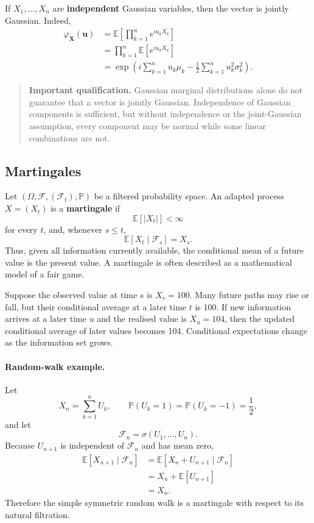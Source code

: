 \documentclass[12pt,openany]{book}
\theoremstyle{definition}
\theoremstyle{remark}
\begin{document}
If \(X_1,\ldots,X_n\) are \textbf{independent} Gaussian variables, then the
vector is jointly Gaussian. Indeed,
\[
\begin{aligned}
\varphi_{\boldsymbol{X}}(\boldsymbol{u})
&=\mathbb{E}\!\left[
\prod_{k=1}^{n}e^{iu_kX_k}
\right]\\
&=\prod_{k=1}^{n}\mathbb{E}[e^{iu_kX_k}]\\
&=\exp\!\left(
i\sum_{k=1}^{n}u_k\mu_k
-\frac{1}{2}\sum_{k=1}^{n}u_k^2\sigma_k^2
\right).
\end{aligned}
\]

\begin{quote}
\colorbox{diagramOrange!12}{%
\parbox{\dimexpr\linewidth-2\fboxsep\relax}{%
\textbf{Important qualification.} Gaussian marginal distributions alone do
not guarantee that a vector is jointly Gaussian. Independence of Gaussian
components is sufficient, but without independence or the joint-Gaussian
assumption, every component may be normal while some linear combinations are
not.}}
\end{quote}

\subsection{Martingales}

Let \((\Omega,\mathcal{F},(\mathcal{F}_t),\mathbb{P})\) be a filtered
probability space. An adapted process \(X=(X_t)\) is a \textbf{martingale} if
\[
\mathbb{E}[|X_t|]<\infty
\]
for every \(t\), and, whenever \(s\leq t\),
\[
\boxed{
\mathbb{E}[X_t\mid\mathcal{F}_s]=X_s
}.
\]
Thus, given all information currently available, the conditional mean of a
future value is the present value. A martingale is often described as a
mathematical model of a fair game.

Suppose the observed value at time \(s\) is \(X_s=100\). Many future paths
may rise or fall, but their conditional average at a later time \(t\) is 100.
If new information arrives at a later time \(u\) and the realised value is
\(X_u=104\), then the updated conditional average of later values becomes
104. Conditional expectations change as the information set grows.

\paragraph{Random-walk example.}
Let
\[
X_n=\sum_{k=1}^{n}U_k,
\qquad
\mathbb{P}(U_k=1)=\mathbb{P}(U_k=-1)=\frac12,
\]
and let
\[
\mathcal{F}_n=\sigma(U_1,\ldots,U_n).
\]
Because \(U_{n+1}\) is independent of \(\mathcal{F}_n\) and has mean zero,
\[
\begin{aligned}
\mathbb{E}[X_{n+1}\mid\mathcal{F}_n]
&=\mathbb{E}[X_n+U_{n+1}\mid\mathcal{F}_n]\\
&=X_n+\mathbb{E}[U_{n+1}]\\
&=X_n.
\end{aligned}
\]
Therefore the simple symmetric random walk is a martingale with respect to
its natural filtration.
\end{document}
